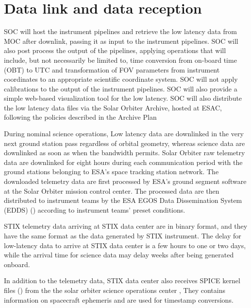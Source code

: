 \documentclass{aa}
\begin{document}

\section{Data link and data reception}

SOC will host the instrument pipelines and retrieve the low latency data from MOC after downlink, passing it as input to the instrument pipelines. SOC will also post process the output of the pipelines, applying operations that will include, but not necessarily be limited to, time conversion from on-board time (OBT) to UTC and transformation of FOV parameters from instrument coordinates to an appropriate scientific coordinate system. SOC will not apply calibrations to the output of the instrument pipelines. SOC will also provide a simple web-based visualization tool for the low latency. SOC will also distribute the low latency data files via the Solar Orbiter Archive, hosted at ESAC, following the policies described in the Archive Plan

During nominal science operations,
Low latency data are downlinked in the very next ground station pass regardless of orbital geometry, whereas science data are downlinked
as soon as when the bandwidth permits.
Solar Orbiter raw telemetry data are downlinked for eight hours during each communication period with the ground stations belonging to ESA's space tracking station network.  The downloaded telemetry data are first processed by ESA's ground segment
software at the Solar Orbiter mission control center.
The processed data are then distributed to instrument teams by the ESA EGOS Data
Dissemination System (EDDS) (\cite{EDDS}) according to instrument teams' preset conditions.



STIX telemetry data arriving at STIX data center  are in binary format, and
they have the same format as the data generated by STIX instrument.
The delay for low-latency data to  arrive at STIX data center is a few hours to one or two days,
while the arrival time for science data may delay weeks after being generated onboard.

In addition to the telemetry data, STIX data center also
receives SPICE kernel files (\cite{spice})  from the the solar orbiter science operations center ,
They contains information on spacecraft ephemeris and are used for timestamp conversions.
\end{document}
